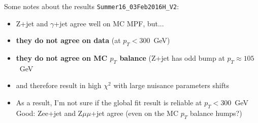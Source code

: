 \documentclass[landscape,10pt]{beamer} %
\begin{document}
Some notes about the results \verb|Summer16_03Feb2016H_V2|:
\begin{itemize}
\item Z+jet and $\gamma$+jet agree well on MC MPF, but...
\item {\bf they do not agree on data} (at $p_T<300$~GeV)
\item {\bf they do not agree on MC $p_T$ balance} (Z+jet has odd bump at $p_T\approx 105$~GeV
\item and therefore result in high $\chi^2$ with large nuisance parameters shifts
\item As a result, I'm not sure if the global fit result is reliable at $p_T<300$~GeV
\but Good: Zee+jet and Z$\mu\mu$+jet agree (even on the MC $p_T$ balance humps?)
\end{itemize}
\end{document}

